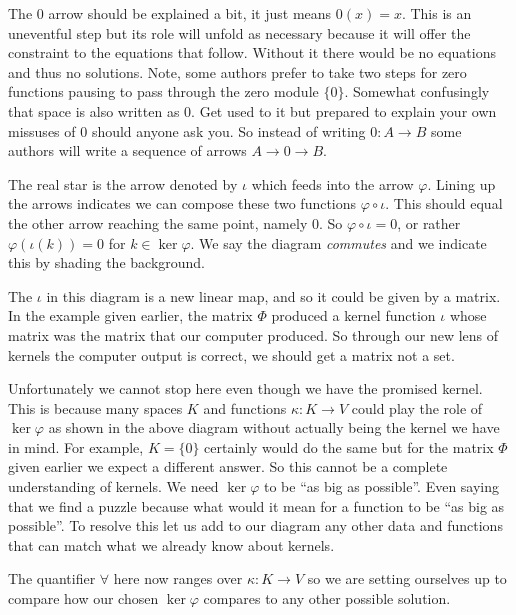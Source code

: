 \documentclass[12pt,twoside,dvipsnames,letterpaper]{memoir}
\begin{document}
The $0$ arrow should be explained a bit, it just means $0(x)=x$.  
This is an uneventful step but its role will unfold as necessary because it will
offer the constraint to the equations that follow.  Without it there would be no
equations and thus no solutions.  Note, some authors prefer to take two steps
for zero functions pausing to pass through the zero module $\{0\}$.  Somewhat
confusingly that space is also written as $0$. Get used to it but prepared to
explain your own missuses of $0$ should anyone ask you. So instead of writing
$0:A\to B$ some authors will write a sequence of arrows $A\to 0\to B$.

The real star is the arrow denoted by $\iota$ which feeds into the arrow
$\varphi$.  Lining up the arrows indicates we can compose these two functions
$\varphi\circ \iota$.  This should equal the other arrow reaching the same
point, namely $0$.  So $\varphi\circ \iota=0$, or rather $\varphi(\iota(k))=0$
for $k\in \ker\varphi$.  We say the diagram \emph{commutes} and we indicate this
by shading the background.

The $\iota$ in this diagram is a new linear map, and so it could be 
given by a matrix.  In the example given earlier, the matrix 
$\Phi$ produced a kernel function $\iota$ whose matrix was the matrix
that our computer produced.  So through our new lens of kernels the 
computer output is correct, we should get a matrix not a set.

Unfortunately we cannot stop here even though we have the promised kernel. This
is because many spaces $K$ and functions $\kappa:K\to V$ could play the role of
$\ker\varphi$ as shown in the above diagram without actually being the kernel we
have in mind.  For example, $K=\{0\}$ certainly would do the same but for the matrix
$\Phi$ given earlier we expect a different answer.  So this cannot be a complete
understanding of kernels.  We need $\ker\varphi$ to be ``as big as possible''.
Even saying that we find a puzzle because what would it mean for a function to
be ``as big as possible''.  To resolve this let us add to our diagram any other
data and functions that can match what we already know about kernels.
\begin{center}
\end{center}
The quantifier $\forall$ here now ranges over $\kappa:K\to V$ so we are 
setting ourselves up to compare how our chosen $\ker\varphi$ compares to 
any other possible solution.
\end{document}
